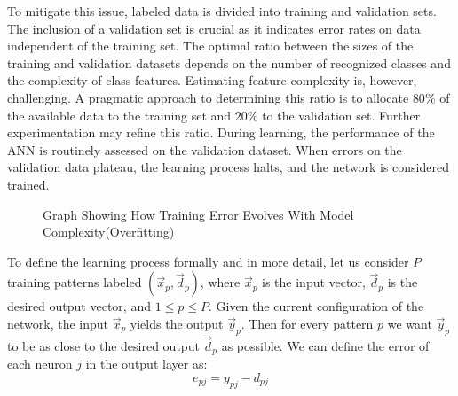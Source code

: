\documentclass[a4paper]{report}
\begin{document}
{To mitigate this issue, labeled data is divided into training and validation sets. The inclusion of a validation set is crucial as it indicates error rates on data independent of the training set. The optimal ratio between the sizes of the training and validation datasets depends on the number of recognized classes and the complexity of class features. Estimating feature complexity is, however, challenging. A pragmatic approach to determining this ratio is to allocate $80\%$ of the available data to the training set and $20\%$ to the validation set. Further experimentation may refine this ratio. During learning, the performance of the ANN is routinely assessed on the validation dataset. When errors on the validation data plateau, the learning process halts, and the network is considered trained.
\begin{center}
\begin{figure}[H]
\centering
{}
\caption{Graph Showing How Training Error Evolves With Model Complexity(Overfitting)}
\end{figure}
\end{center}
\newpage
To define the learning process formally and in more detail, let us consider \(P\) training patterns labeled \((\vec{x}_p, \vec{d}_p)\), where \(\vec{x}_p\) is the input vector, \(\vec{d}_p\) is the desired output vector, and \(1 \leq p \leq P\). Given the current configuration of the network, the input \(\vec{x}_p\) yields the output \(\vec{y}_p\). Then for every pattern \(p\) we want \(\vec{y}_p\) to be as close to the desired output \(\vec{d}_p\) as possible. We can define the error of each neuron \(j\) in the output layer as:
\[ e_{pj} = y_{pj} - d_{pj} \]

}
\end{document}
